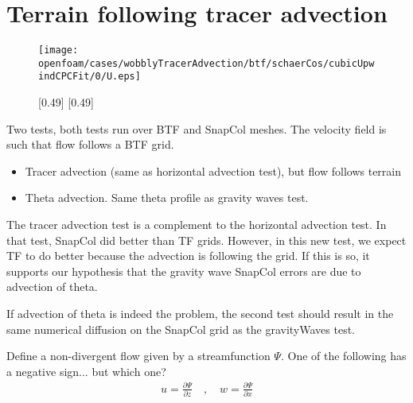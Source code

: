 \section{Terrain following tracer advection}

\begin{figure}
	\centering
	\texttt{[image: openfoam/cases/wobblyTracerAdvection/btf/schaerCos/cubicUpwindCPCFit/0/U.eps]}
	\caption{}
	\label{fig:wobblyTracer:u}
\end{figure}

\begin{figure}
	\captionsetup[subfigure]{position=b}
	\centering
	[0.49\textwidth]{}
	\hfill
	[0.49\textwidth]{}
%
	\caption{}
\end{figure}

Two tests, both tests run over BTF and SnapCol meshes.  The velocity field is such that flow follows a BTF grid.
\begin{itemize}
\item Tracer advection (same as horizontal advection test), but flow follows terrain
\item Theta advection.  Same theta profile as gravity waves test.  
\end{itemize}

The tracer advection test is a complement to the horizontal advection test.  In that test, SnapCol did better than TF grids.  However, in this new test, we expect TF to do better because the advection is following the grid.  If this is so, it supports our hypothesis that the gravity wave SnapCol errors are due to advection of theta.

If advection of theta is indeed the problem, the second test should result in the same numerical diffusion on the SnapCol grid as the gravityWaves test.

Define a non-divergent flow given by a streamfunction $\Psi$.  One of the following has a negative sign... but which one?
\begin{align}
u = \frac{\partial \Psi}{\partial z} \quad,\quad w = \frac{\partial \Psi}{\partial x}
\end{align}

